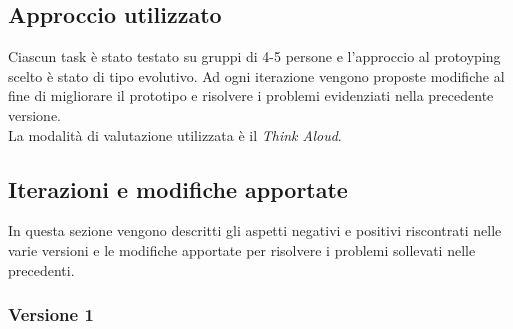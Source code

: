 \subsection{Approccio utilizzato}

Ciascun task è stato testato su gruppi di 4-5 persone e l'approccio al protoyping scelto è stato di tipo evolutivo. Ad ogni iterazione vengono proposte modifiche al fine di migliorare il prototipo e risolvere i problemi evidenziati nella precedente versione. \\
La modalità di valutazione utilizzata è il \emph{Think Aloud}.

\clearpage


\subsection{Iterazioni e modifiche apportate}

In questa sezione vengono descritti gli aspetti negativi e positivi riscontrati nelle varie versioni e le modifiche apportate per risolvere i problemi sollevati nelle precedenti.
\subsubsection{Versione 1}

